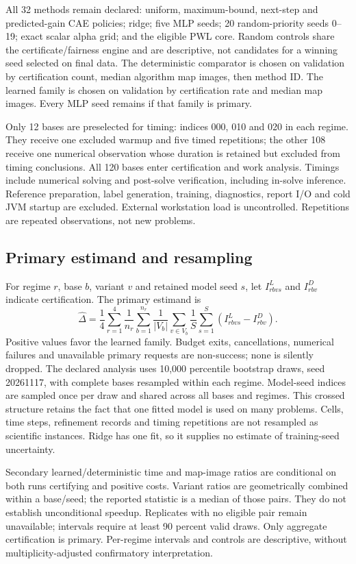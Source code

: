 \documentclass[10pt,a4paper]{article}
\begin{document}
All 32 methods remain declared: uniform, maximum-bound, next-step and
predicted-gain CAE policies; ridge; five MLP seeds; 20 random-priority seeds
0--19; exact scalar alpha grid; and the eligible PWL core. Random controls
share the certificate/fairness engine and are descriptive, not candidates for
a winning seed selected on final data. The deterministic comparator is chosen
on validation by certification count, median algorithm map images, then method
ID. The learned family is chosen on validation by certification rate and median
map images. Every MLP seed remains if that family is primary.

Only 12 bases are preselected for timing: indices 000, 010 and 020 in each
regime. They receive one excluded warmup and five timed repetitions; the other
108 receive one numerical observation whose duration is retained but excluded
from timing conclusions. All 120 bases enter certification and work analysis.
Timings include numerical solving and post-solve verification, including
in-solve inference. Reference preparation, label generation, training,
diagnostics, report I/O and cold JVM startup are excluded. External workstation
load is uncontrolled. Repetitions are repeated observations, not new problems.

\subsection{Primary estimand and resampling}
For regime $r$, base $b$, variant $v$ and retained model seed $s$, let
$I^L_{rbvs}$ and $I^D_{rbv}$ indicate certification. The primary estimand is
\begin{equation}
 \widehat\Delta=\frac14\sum_{r=1}^4\frac1{n_r}\sum_{b=1}^{n_r}
   \frac1{|V_b|}\sum_{v\in V_b}\frac1S\sum_{s=1}^S
       (I^L_{rbvs}-I^D_{rbv}).
\end{equation}
Positive values favor the learned family. Budget exits, cancellations,
numerical failures and unavailable primary requests are non-success; none is
silently dropped. The declared analysis uses 10,000 percentile bootstrap draws,
seed 20261117, with complete bases resampled within each regime. Model-seed
indices are sampled once per draw and shared across all bases and regimes.
This crossed structure retains the fact that one fitted model is used on many
problems. Cells, time steps, refinement records and timing repetitions are not
resampled as scientific instances. Ridge has one fit, so it supplies no estimate
of training-seed uncertainty.

Secondary learned/deterministic time and map-image ratios are conditional on
both runs certifying and positive costs. Variant ratios are geometrically
combined within a base/seed; the reported statistic is a median of those
pairs. They do not establish unconditional speedup. Replicates with no eligible
pair remain unavailable; intervals require at least 90 percent valid draws.
Only aggregate certification is primary. Per-regime intervals and controls
are descriptive, without multiplicity-adjusted confirmatory interpretation.
\end{document}
